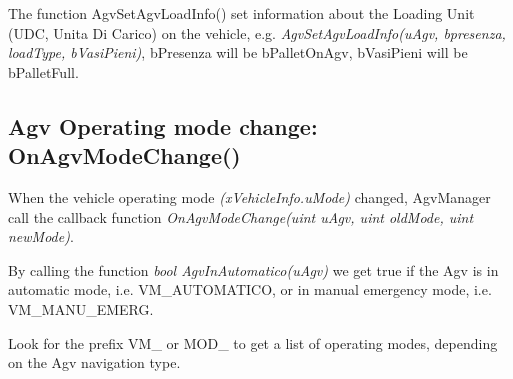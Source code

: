 The function AgvSetAgvLoadInfo() set information about the Loading Unit (UDC, Unita Di Carico) on the vehicle, e.g. \textit{AgvSetAgvLoadInfo(uAgv, bpresenza, loadType, bVasiPieni)}, bPresenza will be bPalletOnAgv, bVasiPieni will be bPalletFull.

\subsection{Agv Operating mode change: OnAgvModeChange()}
When the vehicle operating mode \textit{(xVehicleInfo.uMode)} changed, AgvManager call the callback function \textit{OnAgvModeChange(uint uAgv, uint oldMode, uint newMode)}.

By calling the function \textit{bool AgvInAutomatico(uAgv)} we get true if the Agv is in automatic mode, i.e. VM\_AUTOMATICO, or in manual emergency mode, i.e. VM\_MANU\_EMERG.

Look for the prefix VM\_ or MOD\_ to get a list of operating modes, depending on the Agv navigation type.














